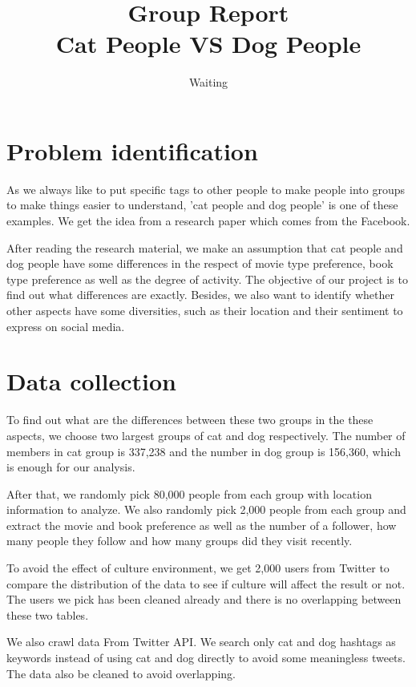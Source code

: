 \documentclass[12pt]{article}
\title{Group Report \\ Cat People VS Dog People}
\author{Waiting}
\date{\vspace{-8ex}}
\begin{document}
\maketitle

\newpage

\tableofcontents
\newpage

\section{Problem identification}

As we always like to put specific tags to other people to make people into groups to make things easier to understand, 'cat people and dog people' is one of these examples. We get the idea from a research paper which comes from the Facebook\cite{lada}.

After reading the research material, we make an assumption that cat people and dog people have some differences in the respect of movie type preference, book type preference as well as the degree of activity. The objective of our project is to find out what differences are exactly. Besides, we also want to identify whether other aspects have some diversities, such as their location and their sentiment to express on social media.


\section{Data collection}

To find out what are the differences between these two groups in the these aspects, we choose two largest groups of cat and dog respectively. The number of members in cat group is 337,238 and the number in dog group is 156,360, which is enough for our analysis.

After that, we randomly pick 80,000 people from each group with location information to analyze. We also randomly pick 2,000 people from each group and extract the movie and book preference as well as the number of a follower, how many people they follow and how many groups did they visit recently.

To avoid the effect of culture environment, we get 2,000 users from Twitter to compare the distribution of the data to see if culture will affect the result or not. The users we pick has been cleaned already and there is no overlapping between these two tables.

We also crawl data From Twitter API. We search only cat and dog hashtags as keywords instead of using cat and dog directly to avoid some meaningless tweets. The data also be cleaned to avoid overlapping.
\end{document}
